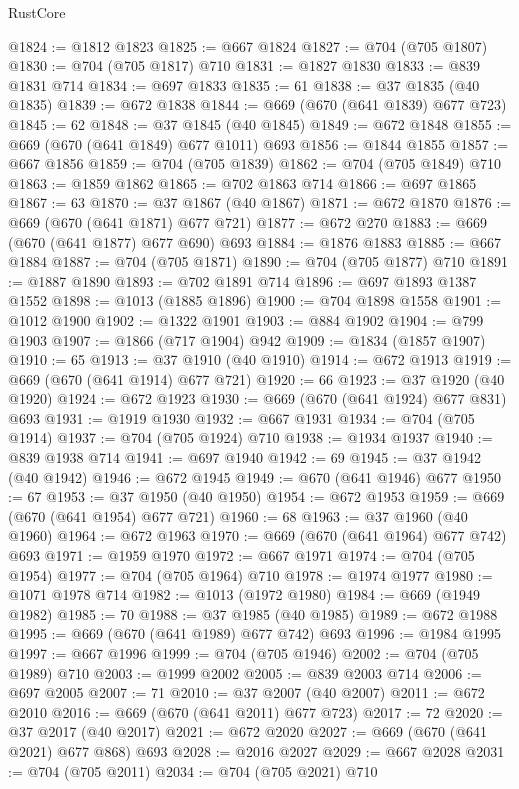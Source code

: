 \begin{lexlean}{RustCore}
\begin{coremodule}
@1824 := @1812 @1823
@1825 := @667 @1824
@1827 := @704 (@705 @1807)
@1830 := @704 (@705 @1817) @710
@1831 := @1827 @1830
@1833 := @839 @1831 @714
@1834 := @697 @1833
@1835 := 61
@1838 := @37 @1835 (@40 @1835)
@1839 := @672 @1838
@1844 := @669 (@670 (@641 @1839) @677 @723)
@1845 := 62
@1848 := @37 @1845 (@40 @1845)
@1849 := @672 @1848
@1855 := @669 (@670 (@641 @1849) @677 @1011) @693
@1856 := @1844 @1855
@1857 := @667 @1856
@1859 := @704 (@705 @1839)
@1862 := @704 (@705 @1849) @710
@1863 := @1859 @1862
@1865 := @702 @1863 @714
@1866 := @697 @1865
@1867 := 63
@1870 := @37 @1867 (@40 @1867)
@1871 := @672 @1870
@1876 := @669 (@670 (@641 @1871) @677 @721)
@1877 := @672 @270
@1883 := @669 (@670 (@641 @1877) @677 @690) @693
@1884 := @1876 @1883
@1885 := @667 @1884
@1887 := @704 (@705 @1871)
@1890 := @704 (@705 @1877) @710
@1891 := @1887 @1890
@1893 := @702 @1891 @714
@1896 := @697 @1893 @1387 @1552
@1898 := @1013 (@1885 @1896)
@1900 := @704 @1898 @1558
@1901 := @1012 @1900
@1902 := @1322 @1901
@1903 := @884 @1902
@1904 := @799 @1903
@1907 := @1866 (@717 @1904) @942
@1909 := @1834 (@1857 @1907)
@1910 := 65
@1913 := @37 @1910 (@40 @1910)
@1914 := @672 @1913
@1919 := @669 (@670 (@641 @1914) @677 @721)
@1920 := 66
@1923 := @37 @1920 (@40 @1920)
@1924 := @672 @1923
@1930 := @669 (@670 (@641 @1924) @677 @831) @693
@1931 := @1919 @1930
@1932 := @667 @1931
@1934 := @704 (@705 @1914)
@1937 := @704 (@705 @1924) @710
@1938 := @1934 @1937
@1940 := @839 @1938 @714
@1941 := @697 @1940
@1942 := 69
@1945 := @37 @1942 (@40 @1942)
@1946 := @672 @1945
@1949 := @670 (@641 @1946) @677
@1950 := 67
@1953 := @37 @1950 (@40 @1950)
@1954 := @672 @1953
@1959 := @669 (@670 (@641 @1954) @677 @721)
@1960 := 68
@1963 := @37 @1960 (@40 @1960)
@1964 := @672 @1963
@1970 := @669 (@670 (@641 @1964) @677 @742) @693
@1971 := @1959 @1970
@1972 := @667 @1971
@1974 := @704 (@705 @1954)
@1977 := @704 (@705 @1964) @710
@1978 := @1974 @1977
@1980 := @1071 @1978 @714
@1982 := @1013 (@1972 @1980)
@1984 := @669 (@1949 @1982)
@1985 := 70
@1988 := @37 @1985 (@40 @1985)
@1989 := @672 @1988
@1995 := @669 (@670 (@641 @1989) @677 @742) @693
@1996 := @1984 @1995
@1997 := @667 @1996
@1999 := @704 (@705 @1946)
@2002 := @704 (@705 @1989) @710
@2003 := @1999 @2002
@2005 := @839 @2003 @714
@2006 := @697 @2005
@2007 := 71
@2010 := @37 @2007 (@40 @2007)
@2011 := @672 @2010
@2016 := @669 (@670 (@641 @2011) @677 @723)
@2017 := 72
@2020 := @37 @2017 (@40 @2017)
@2021 := @672 @2020
@2027 := @669 (@670 (@641 @2021) @677 @868) @693
@2028 := @2016 @2027
@2029 := @667 @2028
@2031 := @704 (@705 @2011)
@2034 := @704 (@705 @2021) @710

\end{coremodule}
\end{lexlean}
